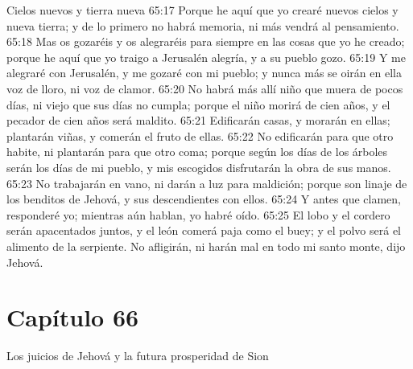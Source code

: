Cielos nuevos y tierra nueva 
65:17 Porque he aquí que yo crearé nuevos cielos y nueva tierra; y de lo primero no habrá memoria, ni más vendrá al pensamiento. 
65:18 Mas os gozaréis y os alegraréis para siempre en las cosas que yo he creado; porque he aquí que yo traigo a Jerusalén alegría, y a su pueblo gozo. 
65:19 Y me alegraré con Jerusalén, y me gozaré con mi pueblo; y nunca más se oirán en ella voz de lloro, ni voz de clamor.  
65:20 No habrá más allí niño que muera de pocos días, ni viejo que sus días no cumpla; porque el niño morirá de cien años, y el pecador de cien años será maldito. 
65:21 Edificarán casas, y morarán en ellas; plantarán viñas, y comerán el fruto de ellas. 
65:22 No edificarán para que otro habite, ni plantarán para que otro coma; porque según los días de los árboles serán los días de mi pueblo, y mis escogidos disfrutarán la obra de sus manos. 
65:23 No trabajarán en vano, ni darán a luz para maldición; porque son linaje de los benditos de Jehová, y sus descendientes con ellos. 
65:24 Y antes que clamen, responderé yo; mientras aún hablan, yo habré oído. 
65:25 El lobo y el cordero serán apacentados juntos, y el león comerá paja como el buey; y el polvo será el alimento de la serpiente. No afligirán, ni harán mal en todo mi santo monte, dijo Jehová. 
\section*{Capítulo 66 }
Los juicios de Jehová y la futura prosperidad de Sion 
 
